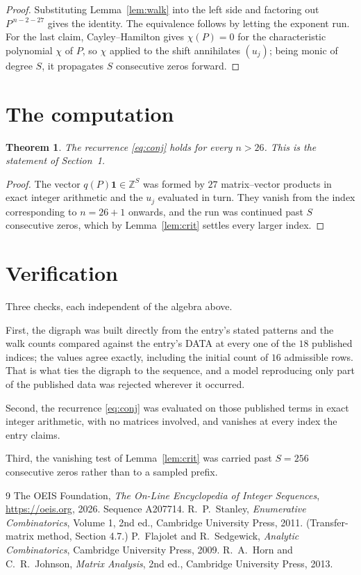 \documentclass[11pt,a4paper]{article}
\theoremstyle{plain}
\newtheorem{theorem}{Theorem}
\theoremstyle{definition}
\begin{document}
\begin{proof}
Substituting Lemma~\ref{lem:walk} into the left side and factoring out
$P^{\,n-2-27}$ gives the identity. The equivalence follows by letting the exponent
run. For the last claim, Cayley--Hamilton gives $\chi(P)=0$ for the characteristic
polynomial $\chi$ of $P$, so $\chi$ applied to the shift annihilates $(u_j)$; being monic of
degree $S$, it propagates $S$ consecutive zeros forward.
\end{proof}

\section{The computation}

\begin{theorem}
The recurrence \eqref{eq:conj} holds for every $n>26$. This is the statement of
Section~1.
\end{theorem}

\begin{proof}
The vector $q(P)\mathbf{1}\in\mathbb{Z}^{S}$ was formed by $27$ matrix--vector
products in exact integer arithmetic and the $u_j$ evaluated in turn. They vanish from the
index corresponding to $n=26+1$ onwards, and the run was continued past $S$ consecutive
zeros, which by Lemma~\ref{lem:crit} settles every larger index.
\end{proof}

\section{Verification}

Three checks, each independent of the algebra above.

First, the digraph was built directly from the entry's stated patterns and the walk counts
compared against the entry's DATA at every one of the $18$ published indices; the
values agree exactly, including the initial count of $16$ admissible rows. That is
what ties the digraph to the sequence, and a model reproducing only part of the published
data was rejected wherever it occurred.

Second, the recurrence \eqref{eq:conj} was evaluated on those published terms in exact
integer arithmetic, with no matrices involved, and vanishes at every index the entry claims.

Third, the vanishing test of Lemma~\ref{lem:crit} was carried past $S=256$ consecutive
zeros rather than to a sampled prefix.

\begin{thebibliography}{9}
 The OEIS Foundation, \emph{The On-Line Encyclopedia of Integer
Sequences}, \url{https://oeis.org}, 2026. Sequence A207714.
 R.~P.~Stanley, \emph{Enumerative Combinatorics}, Volume 1, 2nd ed.,
Cambridge University Press, 2011. (Transfer-matrix method, Section 4.7.)
 P.~Flajolet and R.~Sedgewick, \emph{Analytic Combinatorics}, Cambridge
University Press, 2009.
 R.~A.~Horn and C.~R.~Johnson, \emph{Matrix Analysis}, 2nd ed., Cambridge
University Press, 2013.
\end{thebibliography}
\end{document}
